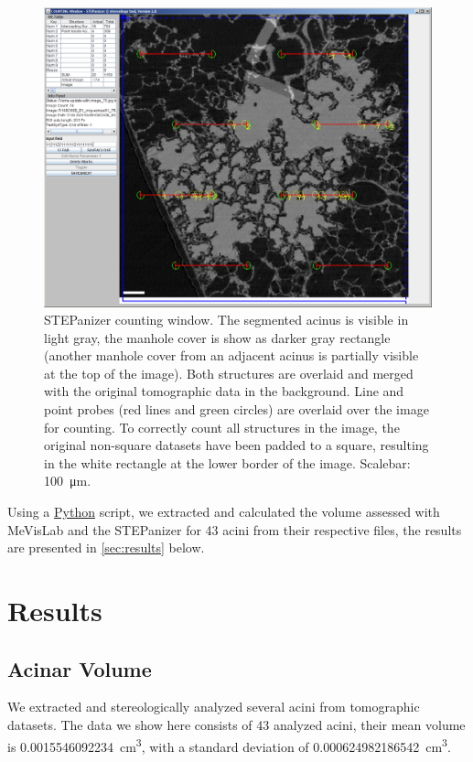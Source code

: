 \documentclass[twoside,paper=a4,abstract=true,english,DIV=calc]{scrartcl}
\newcommand{\imsize}{\linewidth}
\newcommand{\numberofacini}{43}
\newcommand{\volume}{0.0015546092234} %
\newcommand{\std}{0.000624982186542} %
\begin{document}
\renewcommand{\imsize}{\linewidth}%
\begin{figure}
	\centering
	\includegraphics[width=\imsize]{img/STEPanizer_2010_R108C60B_acinus01_Slice75}
	\caption{STEPanizer counting window. The segmented acinus is visible in light gray, the manhole cover is show as darker gray rectangle (another manhole cover from an adjacent acinus is partially visible at the top of the image). Both structures are overlaid and merged with the original tomographic data in the background. Line and point probes (red lines and green circles) are overlaid over the image for counting. To correctly count all structures in the image, the original non-square datasets have been padded to a square, resulting in the white rectangle at the lower border of the image. Scalebar: \SI{100}{\micro\meter}.}
	\label{fig:STEPanizer}
\end{figure}

Using a \href{http://python.org/}{Python} script, we extracted and calculated the volume assessed with MeVisLab and the STEPanizer for 43 acini from their respective files, the results are presented in \autoref{sec:results} below.

\section{Results}
\label{sec:results}
\subsection{Acinar Volume}
We extracted and stereologically analyzed several acini from tomographic datasets. The data we show here consists of \numberofacini\xspace analyzed acini, their mean volume is \SI{\volume}{\centi\metre\cubed}, with a standard deviation of \SI{\std}{\centi\metre\cubed}.
\end{document}
